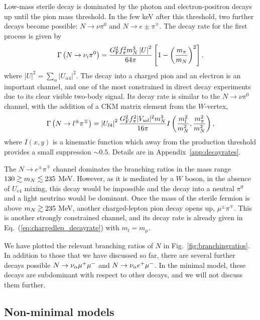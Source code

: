 \documentclass[11pt, a4paper]{article}
\newcommand{\refeq}[1]{Eq.~(\ref{#1})}
\newcommand{\reffig}[1]{Fig.~\ref{#1}}
\newcommand{\refapp}[1]{Appendix~\ref{#1}}
\def\ster{\ensuremath N}
\begin{document}
Low-mass sterile decay is dominated by the photon and electron-positron decays
up until the pion mass threshold. In the few keV after this threshold, two
further decays become possible: $N\to\nu \pi^0$ and $N\to e\pm\pi^\mp$. 
%
The decay rate for the first process is given by
%
\[ \Gamma\left(\ster \to \nu_i \pi^0\right) =
\frac{G_\text{F}^2f_\pi^2m_\ster^3\left|U\right|^2}{64\pi} \left[1-\left(
\frac{m_\pi}{m_\ster} \right)^2\right].  \]
%
where $\left|U\right|^2 = \sum_{\alpha}\left|U_{\alpha 4}\right|^2$.
% 
The decay into a charged pion and an electron is an important channel, and one
of the most constrained in direct decay experiments due to its clear visible
two-body signal.  Its decay rate is similar to the $N\to \nu
\pi^0$ channel, with the addition of a CKM matrix element from the $W$-vertex,
%
\begin{align} \Gamma\left(\ster\to l^\pm\pi^\mp\right) =
\left|U_{l4}\right|^2\frac{G_\text{F}^2f_\pi^2 |V_{ud}|^2
m_\ster^3}{16\pi}I\left(\frac{m_l^2}{m_\ster^2} ,
\frac{m_\pi^2}{m_\ster^2}\right) , \label{eq:chargedlep_decayrate}\end{align}
%
where $I(x,y)$ is a kinematic function which away from the production threshold
provides a small suppression $\sim 0.5$. Details are in \refapp{app:decayrates}.

The $N\to e^\pm\pi^\mp$ channel dominates the branching ratios in the mass
range $130 \gtrsim m_\ster  \lesssim 235$ MeV. However, as it is mediated by a
$W$ boson, in the absence of $U_{e4}$ mixing, this decay would be impossible
and the decay into a neutral $\pi^0$ and a light neutrino would be dominant.
Once the mass of the sterile fermion is above $m_\ster \gtrsim 235$ MeV,
another charged-lepton pion decay opens up, $\mu^\pm\pi^\mp$. This is another
strongly constrained channel, and its decay rate is already given in
\refeq{eq:chargedlep_decayrate} with $m_l = m_\mu$. 

We have plotted the relevant branching ratios of $N$ in
\reffig{fig:branchingratios}. In addition to those that we have discussed so
far, there are several further decays possible $\ster\rightarrow \nu_\alpha
\mu^+ \mu^-$ and $\ster \rightarrow \nu_\alpha e^+ \mu^-$. In the minimal
model, these decays are subdominant with respect to other decays, and we will
not discuss them further.

\subsection{Non-minimal models}
\end{document}
